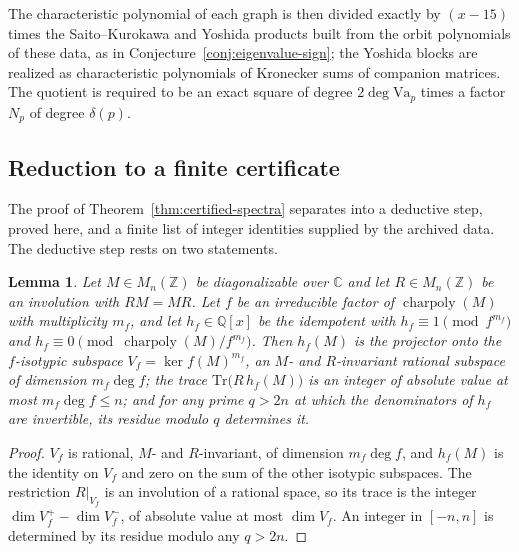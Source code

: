 \documentclass[10pt,a4paper]{amsart}
\newtheorem{lemma}[theorem]{Lemma}
\newcommand{\Q}{\mathbb{Q}}
\newcommand{\Z}{\mathbb{Z}}
\newcommand{\C}{\mathbb{C}}
\newcommand{\Tr}{\mathrm{Tr}}
\newcommand{\Va}{\mathrm{Va}}
\DeclareMathOperator{\charp}{charpoly}
\providecommand{\Va}{\mathrm{Va}}
\providecommand{\charp}{\operatorname{charpoly}}
\begin{document}
	The characteristic polynomial of each graph is then divided exactly by
	$(x-15)$ times the Saito--Kurokawa and Yoshida products built from the
	orbit polynomials of these data, as in
	Conjecture~\ref{conj:eigenvalue-sign}; the Yoshida blocks are realized as
	characteristic polynomials of Kronecker sums of companion matrices. The
	quotient is required to be an exact square of degree $2\deg\Va_p$ times a
	factor $N_p$ of degree $\delta(p)$.
	
	\subsection{Reduction to a finite certificate}
	\label{ss:finitecert}
	
	The proof of Theorem~\ref{thm:certified-spectra} separates into a
	deductive step, proved here, and a finite list of integer identities
	supplied by the archived data. The deductive step rests on two statements.
	
	\begin{lemma}	\label{lem:onemod}
		Let $M\in M_n(\Z)$ be diagonalizable over $\C$ and let $R\in M_n(\Z)$ be an
		involution with $RM=MR$. Let $f$ be an irreducible factor of $\charp(M)$
		with multiplicity $m_f$, and let $h_f\in\Q[x]$ be the idempotent with
		$h_f\equiv1\pmod{f^{m_f}}$ and $h_f\equiv0\pmod{\charp(M)/f^{m_f}}$. Then
		$h_f(M)$ is the projector onto the $f$-isotypic subspace
		$V_f=\ker f(M)^{m_f}$, an $M$- and $R$-invariant rational subspace of
		dimension $m_f\deg f$; the trace $\Tr\bigl(R\,h_f(M)\bigr)$ is an integer
		of absolute value at most $m_f\deg f\le n$; and for any prime $q>2n$ at
		which the denominators of $h_f$ are invertible, its residue modulo $q$
		determines it.
	\end{lemma}
	
	\begin{proof}
		$V_f$ is rational, $M$- and $R$-invariant, of dimension $m_f\deg f$, and
		$h_f(M)$ is the identity on $V_f$ and zero on the sum of the other
		isotypic subspaces. The restriction $R|_{V_f}$ is an involution of a
		rational space, so its trace is the integer
		$\dim V_f^+-\dim V_f^-$, of absolute value at most $\dim V_f$. An integer
		in $[-n,n]$ is determined by its residue modulo any $q>2n$.
	\end{proof}
	
\end{document}
